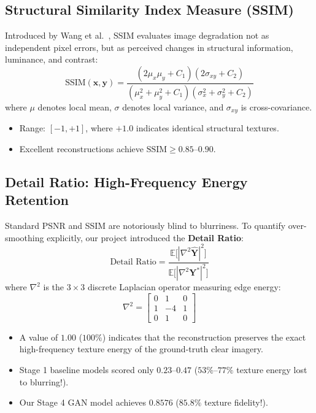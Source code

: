 \subsection{Structural Similarity Index Measure (SSIM)}
Introduced by Wang et al.~\cite{wang2004ssim}, SSIM evaluates image degradation not as independent pixel errors, but as perceived changes in structural information, luminance, and contrast:
\begin{equation}
\text{SSIM}(\mathbf{x}, \mathbf{y}) = \frac{(2\mu_x \mu_y + C_1)(2\sigma_{xy} + C_2)}{(\mu_x^2 + \mu_y^2 + C_1)(\sigma_x^2 + \sigma_y^2 + C_2)}
\end{equation}
where $\mu$ denotes local mean, $\sigma$ denotes local variance, and $\sigma_{xy}$ is cross-covariance.
\begin{itemize}
    \item Range: $[-1, +1]$, where $+1.0$ indicates identical structural textures.
    \item Excellent reconstructions achieve $\text{SSIM} \ge 0.85\text{--}0.90$.
\end{itemize}

\subsection{Detail Ratio: High-Frequency Energy Retention}
Standard PSNR and SSIM are notoriously blind to blurriness. To quantify over-smoothing explicitly, our project introduced the \textbf{Detail Ratio}:
\begin{equation}
\text{Detail Ratio} = \frac{\mathbb{E}\big[ |\nabla^2 \hat{\mathbf{Y}}|^2 \big]}{\mathbb{E}\big[ |\nabla^2 \mathbf{Y}^*|^2 \big]}
\end{equation}
where $\nabla^2$ is the $3 \times 3$ discrete Laplacian operator measuring edge energy:
\[
\nabla^2 = \begin{bmatrix} 0 & 1 & 0 \\ 1 & -4 & 1 \\ 0 & 1 & 0 \end{bmatrix}
\]
\begin{itemize}
    \item A value of $1.00$ ($100\%$) indicates that the reconstruction preserves the exact high-frequency texture energy of the ground-truth clear imagery.
    \item Stage 1 baseline models scored only $\mathbf{0.23\text{--}0.47}$ ($53\%\text{--}77\%$ texture energy lost to blurring!).
    \item Our Stage 4 GAN model achieves $\mathbf{0.8576}$ ($85.8\%$ texture fidelity!).
\end{itemize}

